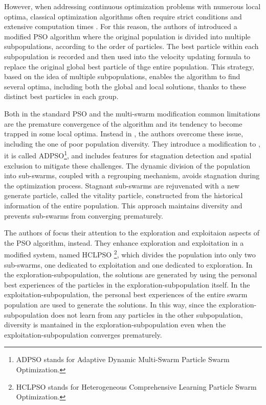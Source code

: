 However, when addressing continuous optimization problems with numerous local optima, 
classical optimization algorithms often require strict conditions 
and extensive computation times \cite{PSO_another}.
For this reason, the authors of  \cite{PSO_IMPORTANT} introduced a modified PSO algorithm 
where the original population is divided into multiple subpopulations, 
according to the order of particles.
The best particle within each subpopulation is recorded and then 
used into the velocity updating formula to replace 
the original global best particle of thge entire population.
This strategy, based on the idea of multiple subpopulations, 
enables the algorithm to find several optima, including both
the global and local solutions, thanks to these distinct best particles
in each group.

Both in the standard PSO \cite{PSO_original} and the multi-swarm modification \cite{PSO_IMPORTANT}
common limitations are the premature convergence of the algorithm 
and its tendency to become trapped in some local optima.
Instead in \cite{PSO_another}, the authors overcome these issue,
including the one of poor population diversity. 
They introduce a modification to \cite{PSO_IMPORTANT}, it is called 
ADPSO\footnote{ADPSO stands for Adaptive Dynamic Multi-Swarm Particle Swarm Optimization.}, 
and includes features for stagnation detection and spatial exclusion to mitigate these challenges. 
The dynamic division of the population into sub-swarms, 
coupled with a regrouping mechanism, avoids stagnation during the optimization process. 
Stagnant sub-swarms are rejuvenated with a new generate particle, 
called the vitality particle, constructed from the historical information of the entire population. 
This approach maintains diversity and prevents sub-swarms from converging prematurely.

The authors of \cite{PSO_another2} focus their attention to the 
exploration and exploitaion aspects of the PSO algorithm, instead.
They enhance exploration and exploitation in a modified system,
named HCLPSO \footnote{HCLPSO stands for Heterogeneous Comprehensive 
Learning Particle Swarm Optimization.}, which divides the population 
into only two sub-swarms, one dedicated to exploitation and 
one dedicated to exploration. 
In the exploration-subpopulation, the solutions are generated by using the personal 
best experiences of the particles in the exploration-subpopulation itself. 
In the exploitation-subpopulation, the personal best experiences of the
entire swarm population are used to generate the solutions. 
In this way, since the exploration-subpopulation does not
learn from any particles in the other subpopulation, 
diversity is mantained in the exploration-subpopulation even when the 
exploitation-subpopulation converges prematurely.

